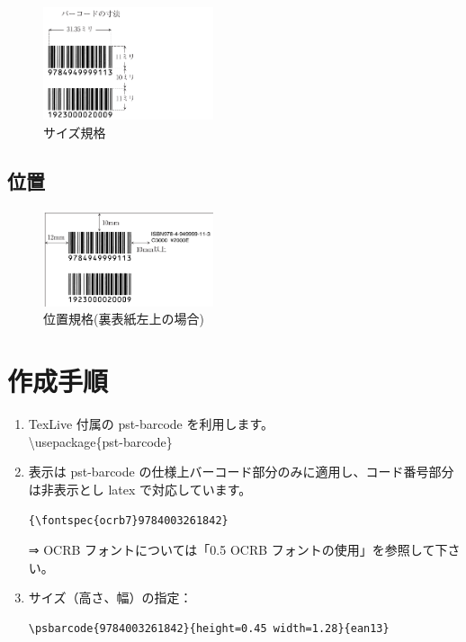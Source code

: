 \documentclass[a5j,tombo,10pt,titlepage,pdfusetitle]{ltjsbook}
\def\fs#1#2{\fontsize{#1}{#2}\selectfont }
\begin{document}
{\begin{figure}[H]
\centering
\includegraphics[width=5cm,angle=0]{./images/isbn-layout01.png}
\caption{サイズ規格} 
\end{figure}

\subsection{位置} 

\begin{figure}[H]
\centering
\includegraphics[width=5cm,angle=0]{./images/isbn-layout02.png}
\caption{位置規格(裏表紙左上の場合)} 
\end{figure}


\newpage
\thispagestyle{empty}

\section{作成手順}   

\begin{enumerate}
  \item TexLive 付属の pst-barcode を利用します。\\
  \textbackslash usepackage\{pst-barcode\}
  
  \item 表示は pst-barcode の仕様上バーコード部分のみに適用し、コード番号部分は非表示とし latex で対応しています。\vspace{-2mm}
\begin{verbatim}
{\fontspec{ocrb7}9784003261842}
\end{verbatim}\vspace{-2mm}
{\fs{8}{8}⇒ OCRB フォントについては「0.5 OCRB フォントの使用」を参照して下さい。}

  \item サイズ（高さ、幅）の指定：\vspace{-2mm}
\begin{verbatim}
\psbarcode{9784003261842}{height=0.45 width=1.28}{ean13}
\end{verbatim}\vspace{-2mm}


\end{enumerate}}
\end{document}
